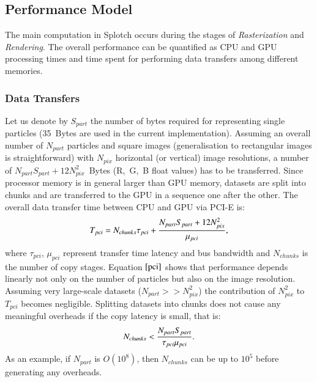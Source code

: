 \documentclass[preprint,5pt]{elsarticle}
\begin{document}
\subsection{Performance Model}
\label{sec:model}

The main computation in Splotch occurs during the stages of {\it Rasterization} and {\it Rendering}.
The overall performance can be quantified as CPU and GPU processing times 
and time spent for performing data transfers among different memories.

\subsubsection{Data Transfers}
Let us denote by $S_{part}$ the number of bytes required for representing single particles (35~Bytes are used in the current implementation). Assuming an overall number of $N_{part}$ particles
and square images (generalisation to rectangular images is straightforward) with $N_{pix}$ horizontal (or vertical) image resolutions, a number of $N_{part} S_{part} + 12 N_{pix}^2$~Bytes (R,~G,~B float values) has to be transferred. 
Since processor memory is in general larger than GPU memory,
datasets are split into chunks and are transferred to the GPU in a sequence one after the other. The overall data transfer time between CPU and GPU via PCI-E is:
\begin{equation}\label{pci}
T_{pci} =  N_{chunks} \tau_{pci} + {N_{part} S_{part} + 12 N_{pix}^2 \over 
\mu_{pci}},
\end{equation}
where $\tau_{pci}$, $\mu_{pci}$ represent transfer time latency and bus bandwidth and $N_{chunks}$ is the number of copy stages. Equation $\eqref{pci}$ shows that performance depends linearly not only on the number of particles but also on the image resolution. Assuming very large-scale datasets ($N_{part} >> N_{pix}^2$) the contribution of $N_{pix}^2$ to $T_{pci}$ becomes negligible. 
Splitting datasets into chunks does not cause any meaningful overheads if the copy latency is small, that is:
\begin{equation}
N_{chunks} < {N_{part} S_{part}\over \tau_{pci}\mu_{pci}}.
\end{equation}
As an example, if $N_{part}$ is $O(10^8)$, then $N_{chunks}$ can be up to $10^5$ before
generating any overheads. 
\end{document}
